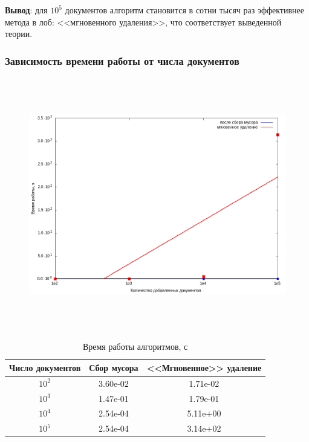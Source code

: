 \textbf{Вывод}: для $10^5$ документов алгоритм становится в сотни тысяч раз
эффективнее метода в лоб: <<мгновенного удаления>>, что соответствует выведенной теории.

\subsubsection{Зависимость времени работы от числа документов}

\begin{figure}[H]
\includegraphics[width=\linewidth, height=11cm]{fig/time.png}
\end{figure}

\begin{table}[H]
      \caption{Время работы алгоритмов, с}
      \centering
      \small
      \singlespacing
      \begin{tabular}{|c|c|c|}
            \hline
            Число документов & Сбор мусора                & <<Мгновенное>> удаление \\ \hline \hline
            $10^2$           & 3.60e-02                   & 1.71e-02              \\ \hline
            $10^3$           & 1.47e-01                   & 1.79e-01              \\ \hline
            $10^4$           & 2.54e-04                   & 5.11e+00              \\ \hline
            $10^5$           & 2.54e-04                   & 3.14e+02              \\ \hline
\end{tabular}
\end{table}

